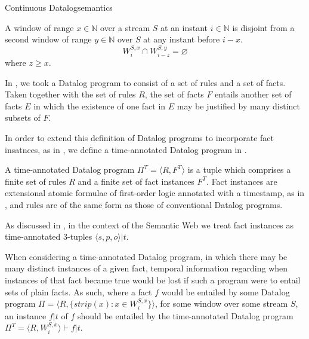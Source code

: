 \begin{nestedsection}{Continuous Datalog}{semantics}
\begin{axiom}\label{axiom:continuous datalog: window disjointness}
A window of range ${x \in \mathbb{N}}$ over a stream $S$ at an
instant ${i \in \mathbb{N}}$ is disjoint from a second window of 
range ${y \in \mathbb{N}}$ over $S$ at any instant before $i - x$.
\begin{equation*}
W^{S,x}_{i} \cap W^{S,y}_{i-z} = \varnothing
\end{equation*}
where $z \geq x$.
\end{axiom}

In , we took a
Datalog program to consist of a set of rules and a set of facts.
Taken together with the set of rules $R$, the set of facts $F$ entails
another set of facts $E$ in which the existence of one fact in $E$ may
be justified by many distinct subsets of $F$.

In order to extend this
definition of Datalog programs to incorporate fact insatnces,
as in , we define a
time-annotated Datalog program in .

\begin{definition}
A time-annotated Datalog program $\Pi^T = \langle R, F^T\rangle$ is a tuple
which comprises a finite set of rules $R$ and a finite set of fact instances
$F^T$. Fact instances are extensional atomic formulae of first-order logic
annotated with a timestamp, as in ,
and rules are of the same form as those of conventional Datalog programs.

As discussed in ,
in the context of the Semantic Web we treat fact instances as time-annotated
3-tuples ${\langle s, p, o \rangle | t}$.
\end{definition}

When considering a time-annotated Datalog program, in which there may be
many distinct instances of a given fact, temporal information regarding when
instances of that fact became true would be lost if such a program were to entail
sets of plain facts. As such, where a fact $f$ would be entailed by some Datalog
program ${\Pi = \langle R, \{ strip(x) : x \in W^{S,x}_i \} \rangle}$,
for some window over some stream $S$, an instance ${f | t}$ of $f$ should be
entailed by the time-annotated Datalog program
${\Pi^T = \langle R, W^{S,x}_i \rangle \vdash f | t}$.


\end{nestedsection}
